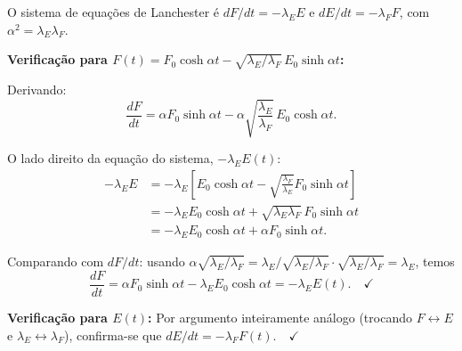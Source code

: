 O sistema de equações de Lanchester é $dF/dt = -\lambda_E E$ e $dE/dt = -\lambda_F F$, com $\alpha^2=\lambda_E\lambda_F$.

\textbf{Verificação para $F(t) = F_0\cosh\alpha t - \sqrt{\lambda_E/\lambda_F}\,E_0\sinh\alpha t$:}

Derivando:
\[
\frac{dF}{dt} = \alpha F_0\sinh\alpha t - \alpha\sqrt{\frac{\lambda_E}{\lambda_F}}\,E_0\cosh\alpha t.
\]

O lado direito da equação do sistema, $-\lambda_E E(t)$:
\begin{align*}
-\lambda_E E &= -\lambda_E\!\left[E_0\cosh\alpha t - \sqrt{\frac{\lambda_F}{\lambda_E}}F_0\sinh\alpha t\right] \\
&= -\lambda_E E_0\cosh\alpha t + \sqrt{\lambda_E\lambda_F}\,F_0\sinh\alpha t \\
&= -\lambda_E E_0\cosh\alpha t + \alpha F_0\sinh\alpha t.
\end{align*}

Comparando com $dF/dt$: usando $\alpha\sqrt{\lambda_E/\lambda_F} = \lambda_E/\sqrt{\lambda_E/\lambda_F}\cdot\sqrt{\lambda_E/\lambda_F} = \lambda_E$, temos
\[
\frac{dF}{dt} = \alpha F_0\sinh\alpha t - \lambda_E E_0\cosh\alpha t = -\lambda_E E(t).\quad\checkmark
\]

\textbf{Verificação para $E(t)$:} Por argumento inteiramente análogo (trocando $F\leftrightarrow E$ e $\lambda_E\leftrightarrow\lambda_F$), confirma-se que $dE/dt = -\lambda_F F(t).\quad\checkmark$ 